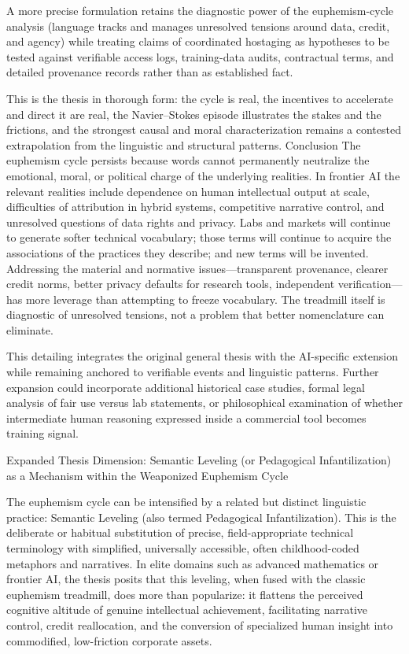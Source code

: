 A more precise formulation retains the diagnostic power of the euphemism-cycle analysis (language tracks and manages unresolved tensions around data, credit, and agency) while treating claims of coordinated hostaging as hypotheses to be tested against verifiable access logs, training-data audits, contractual terms, and detailed provenance records rather than as established fact.

This is the thesis in thorough form: the cycle is real, the incentives to accelerate and direct it are real, the Navier–Stokes episode illustrates the stakes and the frictions, and the strongest causal and moral characterization remains a contested extrapolation from the linguistic and structural patterns.
Conclusion
The euphemism cycle persists because words cannot permanently neutralize the emotional, moral, or political charge of the underlying realities. In frontier AI the relevant realities include dependence on human intellectual output at scale, difficulties of attribution in hybrid systems, competitive narrative control, and unresolved questions of data rights and privacy. Labs and markets will continue to generate softer technical vocabulary; those terms will continue to acquire the associations of the practices they describe; and new terms will be invented. Addressing the material and normative issues—transparent provenance, clearer credit norms, better privacy defaults for research tools, independent verification—has more leverage than attempting to freeze vocabulary. The treadmill itself is diagnostic of unresolved tensions, not a problem that better nomenclature can eliminate.

This detailing integrates the original general thesis with the AI-specific extension while remaining anchored to verifiable events and linguistic patterns. Further expansion could incorporate additional historical case studies, formal legal analysis of fair use versus lab statements, or philosophical examination of whether intermediate human reasoning expressed inside a commercial tool becomes training signal.

Expanded Thesis Dimension: Semantic Leveling (or Pedagogical Infantilization) as a Mechanism within the Weaponized Euphemism Cycle

The euphemism cycle can be intensified by a related but distinct linguistic practice: Semantic Leveling (also termed Pedagogical Infantilization). This is the deliberate or habitual substitution of precise, field-appropriate technical terminology with simplified, universally accessible, often childhood-coded metaphors and narratives. In elite domains such as advanced mathematics or frontier AI, the thesis posits that this leveling, when fused with the classic euphemism treadmill, does more than popularize: it flattens the perceived cognitive altitude of genuine intellectual achievement, facilitating narrative control, credit reallocation, and the conversion of specialized human insight into commodified, low-friction corporate assets.

